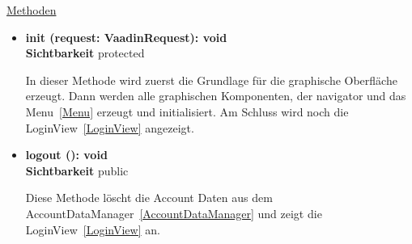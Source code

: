 \underline{Methoden}
\begin{itemize}
\itemsep0pt
\item \textbf{init (request: VaadinRequest): void}\hfill\\
\textbf{Sichtbarkeit} protected

In dieser Methode wird zuerst die Grundlage für die graphische Oberfläche erzeugt. Dann werden alle graphischen Komponenten, der navigator und das Menu~\eqref{Menu} erzeugt und initialisiert. Am Schluss wird noch die LoginView~\eqref{LoginView} angezeigt.

\item \textbf{logout (): void}\hfill\\
\textbf{Sichtbarkeit} public

Diese Methode löscht die Account Daten aus dem AccountDataManager~\eqref{AccountDataManager} und zeigt die LoginView~\eqref{LoginView} an.

\end{itemize}